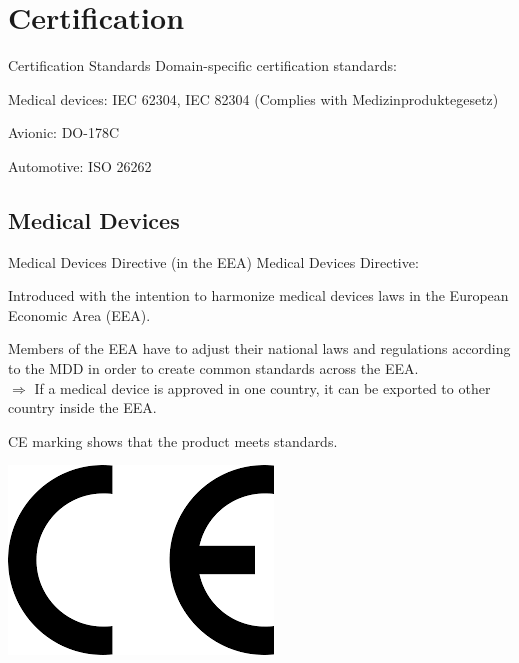 \chapter{Certification}
\label{chap_certification}





\begin{frame}{Certification Standards}
	Domain-specific certification standards:
	
	\begin{beameritemize}
		\item Medical devices: IEC 62304, IEC 82304 (Complies with Medizinproduktegesetz)
		\item Avionic: DO-178C
		\item Automotive: ISO 26262 
	\end{beameritemize}
\end{frame}


\section{Medical Devices}

\begin{frame}{Medical Devices Directive (in the EEA)}
	Medical Devices Directive:
	\begin{beameritemize}
		\item Introduced with the intention to harmonize medical devices laws in the European Economic Area (EEA).
		\item Members of the EEA have to adjust their national laws and regulations according to the MDD in order to create common standards across the EEA.\\
		$\Rightarrow$ If a medical device is approved in one country, it can be exported to other country inside the EEA.
		\item CE marking shows that the product meets standards.
	\end{beameritemize}	

  	\xxx
	\centering
	\includegraphics[width=0.1\linewidth]{content/images/certification/CE}
\end{frame}



